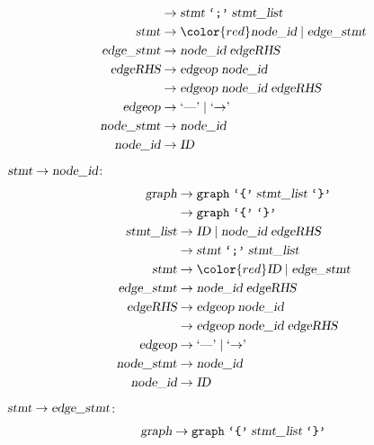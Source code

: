 \begin{loesung}
\begin{teilaufgaben}
\begin{align*}
                   &\rightarrow \textsl{stmt}\; \texttt{`;'}\; \textsl{stmt\_list}\\
\textsl{stmt}      &\rightarrow {\color{red}\textsl{node\_id}}\; |\;
                                \textsl{edge\_stmt} \\
\textsl{edge\_stmt}&\rightarrow \textsl{node\_id}\; \textsl{edgeRHS} \\
\textsl{edgeRHS}   &\rightarrow \textsl{edgeop}\; \textsl{node\_id}\\
                   &\rightarrow \textsl{edgeop}\; \textsl{node\_id}\; \textsl{edgeRHS}\\
\textsl{edgeop}    &\rightarrow \textrm{`\text{---}'}\; |\; \textrm{`$\rightarrow$'}\; \\
\textsl{node\_stmt}&\rightarrow \textsl{node\_id} \\
\textsl{node\_id}  &\rightarrow \textsl{ID}
\end{align*}
$\textsl{stmt}\to\textsl{node\_id}$:
\begin{align*}
\textsl{graph}     &\rightarrow \texttt{graph}\; \texttt{`\{'}\; \textsl{stmt\_list}\; \texttt{`\}'} \\
                   &\rightarrow \texttt{graph}\; \texttt{`\{'}\; \texttt{`\}'} \\
\textsl{stmt\_list}&\rightarrow \textsl{ID}\; |\;
                                \textsl{node\_id}\; \textsl{edgeRHS} \\
                   &\rightarrow \textsl{stmt}\; \texttt{`;'}\; \textsl{stmt\_list}\\
\textsl{stmt}      &\rightarrow {\color{red}\textsl{ID}}\; |\;
                                \textsl{edge\_stmt} \\
\textsl{edge\_stmt}&\rightarrow \textsl{node\_id}\; \textsl{edgeRHS} \\
\textsl{edgeRHS}   &\rightarrow \textsl{edgeop}\; \textsl{node\_id}\\
                   &\rightarrow \textsl{edgeop}\; \textsl{node\_id}\; \textsl{edgeRHS}\\
\textsl{edgeop}    &\rightarrow \textrm{`\text{---}'}\; |\; \textrm{`$\rightarrow$'}\; \\
\textsl{node\_stmt}&\rightarrow \textsl{node\_id} \\
\textsl{node\_id}  &\rightarrow \textsl{ID}
\end{align*}
$\textsl{stmt}\to\textsl{edge\_stmt}$:
\begin{align*}
\textsl{graph}     &\rightarrow \texttt{graph}\; \texttt{`\{'}\; \textsl{stmt\_list}\; \texttt{`\}'} \\

\end{align*}
\end{teilaufgaben}
\end{loesung}
